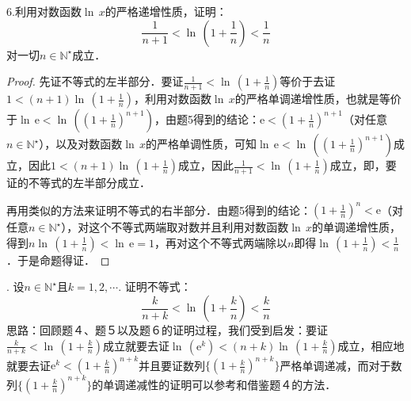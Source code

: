 \noindent 6.利用对数函数$\ln \, x$的严格递增性质，证明：
\begin{equation}
    \frac{1}{n+1} < \ln \, \left( 1+\frac{1}{n} \right) < \frac{1}{n}
\end{equation}
对一切$n \in \mathbb{N}^\star$成立．
\begin{proof}
先证不等式的左半部分．要证$\displaystyle \frac{1}{n+1} < \ln \, \left( 1+\frac{1}{n} \right)$等价于去证$\displaystyle 1 < (n+1) \ln \, \left( 1+\frac{1}{n} \right)$，利用对数函数$\ln \, x$的严格单调递增性质，也就是等价于$\ln \, \mathrm{e} < \ln \, \left(\left( 1 + \frac{1}{n} \right)^{n+1} \right)$，由题5得到的结论：$\displaystyle \mathrm{e} < \left( 1+\frac{1}{n} \right)^{n+1}$（对任意$n \in \mathbb{N}^\star$），以及对数函数$\ln \, x$的严格单调性质，可知$\ln \, \mathrm{e} < \ln \, \left( \left( 1 + \frac{1}{n} \right)^{n+1} \right)$成立，因此$\displaystyle 1 < (n+1) \ln \, \left( 1+\frac{1}{n} \right)$成立，因此$\displaystyle \frac{1}{n+1} < \ln \, \left( 1 + \frac{1}{n} \right)$成立，即，要证的不等式的左半部分成立．

\noindent 再用类似的方法来证明不等式的右半部分．由题5得到的结论：$\displaystyle \left( 1 + \frac{1}{n} \right)^n < \mathrm{e}$（对任意$n \in \mathbb{N}^\star$），对这个不等式两端取对数并且利用对数函数$\ln \, x$的单调递增性质，得到$\displaystyle n \ln \, \left( 1 + \frac{1}{n} \right) < \ln \, \mathrm{e} = 1$，再对这个不等式两端除以$n$即得$\displaystyle \ln \, \left( 1 + \frac{1}{n}\right) < \frac{1}{n}$．于是命题得证．
\end{proof}
. 设$n \in \mathbb{N}^\star$且$k = 1,2,\cdots$. 证明不等式：
\begin{equation}
    \frac{k}{n+k} < \ln \, \left( 1+\frac{k}{n} \right) < \frac{k}{n}
\end{equation}
\noindent 思路：回顾题４、题５以及题６的证明过程，我们受到启发：要证$\displaystyle \frac{k}{n+k} < \ln \, \left( 1 + \frac{k}{n}\right)$成立就要去证$\displaystyle \ln \, \left( \mathrm{e}^k \right) < (n+k) \ln \, \left( 1 + \frac{k}{n}\right)$成立，相应地就要去证$\displaystyle \mathrm{e}^k < \left(1+\frac{k}{n}\right)^{n+k}$并且要证数列$\displaystyle \{ \left(1+\frac{k}{n}\right)^{n+k} \}$严格单调递减，而对于数列$\displaystyle \{ \left( 1 + \frac{k}{n} \right)^{n+k}\}$的单调递减性的证明可以参考和借鉴题４的方法．
